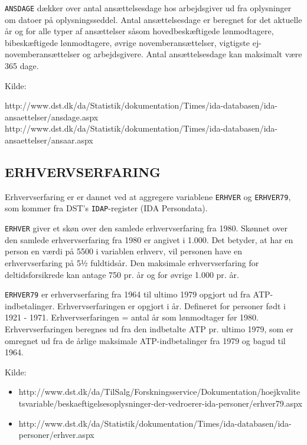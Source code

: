 \begin{itemize} [topsep=6pt,itemsep=-1ex]
\texttt{ANSDAGE} dækker over antal ansættelsesdage hos arbejdsgiver ud fra oplysninger om datoer på oplysningsseddel. Antal ansættelsesdage er beregnet for det aktuelle år og for alle typer af ansættelser såsom hovedbeskæftigede lønmodtagere, bibeskæftigede lønmodtagere, øvrige novemberansættelser, vigtigste ej-novemberansættelser og arbejdsgivere. Antal ansættelsesdage kan maksimalt være 365 dage.

Kilde:
\begin{itemize} [topsep=6pt,itemsep=-1ex]
http://www.dst.dk/da/Statistik/dokumentation/Times/ida-databasen/ida-ansaettelser/ansdage.aspx
http://www.dst.dk/da/Statistik/dokumentation/Times/ida-databasen/ida-ansaettelser/ansaar.aspx
\end{itemize}


\subsection{ERHVERVSERFARING \label{}}

Erhvervserfaring er er dannet ved at aggregere variablene \texttt{ERHVER} og \texttt{ERHVER79}, som kommer fra DST's \texttt{IDAP}-register (IDA Persondata).

\texttt{ERHVER} giver et skøn over den samlede erhvervserfaring fra 1980. Skønnet over den samlede erhvervserfaring fra 1980 er angivet i 1.000. Det betyder, at har en person en værdi på 5500 i variablen erhverv, vil personen have en erhvervserfaring på 5½ fuldtidsår. Den maksimale erhvervserfaring for deltidsforsikrede kan antage 750 pr. år og for øvrige 1.000 pr. år.

\texttt{ERHVER79} er erhvervserfaring fra 1964 til ultimo 1979 opgjort ud fra ATP-indbetalinger. Erhvervserfaringen er opgjort i år. Defineret for personer født i 1921 - 1971. Erhvervserfaringen = antal år som lønmodtager før 1980. Erhvervserfaringen beregnes ud fra den indbetalte ATP pr. ultimo 1979, som er omregnet ud fra de årlige maksimale ATP-indbetalinger fra 1979 og bagud til 1964.

Kilde:
\begin{itemize} [topsep=6pt,itemsep=-1ex]
  \item http://www.dst.dk/da/TilSalg/Forskningsservice/Dokumentation/hoejkvalitetsvariable/beskaeftigelsesoplysninger-der-vedroerer-ida-personer/erhver79.aspx
  \item http://www.dst.dk/da/Statistik/dokumentation/Times/ida-databasen/ida-personer/erhver.aspx
\end{itemize}



\end{itemize}
